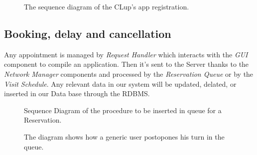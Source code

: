 \begin{figure}[H]
  \label{RegistrationSD}
  \centering
    \caption{The sequence diagram of the CLup's app registration.}
\end{figure} 

\subsection{Booking, delay and cancellation}

Any appointment is managed by \textit{Request Handler} which interacts with the \textit{GUI} component to compile an application. Then it's sent to the Server thanks to the \textit{Network Manager} components and processed by the \textit{Reservation Queue} or by the \textit{Visit Schedule}. Any relevant data in our system will be updated, delated, or inserted in our Data base through the RDBMS.


\begin{figure}[H]
  \label{ReservatioSD}
  \centering
    \caption{Sequence Diagram of the procedure to be inserted in queue for a Reservation.}
\end{figure} 


\begin{figure}[H]
  \label{PostponeReservationSD}
  \centering
    \caption{The diagram shows how a generic user postopones his turn in the queue. }
\end{figure} 



